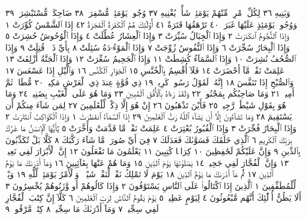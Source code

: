 وَبَنِيهِ ٣٦ لِكُلِّ ٱمْرِئࣲ مِّنْهُمْ يَوْمَئِذࣲ شَأْنࣱ يُغْنِيهِ ٣٧ وُجُوهࣱ يَوْمَئِذࣲ
مُّسْفِرَةࣱ ٣٨ ضَاحِكَةࣱ مُّسْتَبْشِرَةࣱ ٣٩ وَوُجُوهࣱ يَوْمَئِذٍ عَلَيْهَا غَبَرَةࣱ ٤٠
تَرْهَقُهَا قَتَرَةٌ ٤١ أُو۟لَٰٓئِكَ هُمُ ٱلْكَفَرَةُ ٱلْفَجَرَةُ ٤٢
إِذَا ٱلشَّمْسُ كُوِّرَتْ ١ وَإِذَا ٱلنُّجُومُ ٱنكَدَرَتْ ٢ وَإِذَا ٱلْجِبَالُ
سُيِّرَتْ ٣ وَإِذَا ٱلْعِشَارُ عُطِّلَتْ ٤ وَإِذَا ٱلْوُحُوشُ حُشِرَتْ ٥
وَإِذَا ٱلْبِحَارُ سُجِّرَتْ ٦ وَإِذَا ٱلنُّفُوسُ زُوِّجَتْ ٧ وَإِذَا ٱلْمَوْءُۥدَةُ
سُئِلَتْ ٨ بِأَيِّ ذَنۢبࣲ قُتِلَتْ ٩ وَإِذَا ٱلصُّحُفُ نُشِرَتْ ١٠
وَإِذَا ٱلسَّمَآءُ كُشِطَتْ ١١ وَإِذَا ٱلْجَحِيمُ سُعِّرَتْ ١٢ وَإِذَا ٱلْجَنَّةُ
أُزْلِفَتْ ١٣ عَلِمَتْ نَفْسࣱ مَّآ أَحْضَرَتْ ١٤ فَلَآ أُقْسِمُ بِٱلْخُنَّسِ ١٥
ٱلْجَوَارِ ٱلْكُنَّسِ ١٦ وَٱلَّيْلِ إِذَا عَسْعَسَ ١٧ وَٱلصُّبْحِ إِذَا تَنَفَّسَ ١٨
إِنَّهُۥ لَقَوْلُ رَسُولࣲ كَرِيمࣲ ١٩ ذِي قُوَّةٍ عِندَ ذِي ٱلْعَرْشِ مَكِينࣲ ٢٠ مُّطَاعࣲ ثَمَّ
أَمِينࣲ ٢١ وَمَا صَاحِبُكُم بِمَجْنُونࣲ ٢٢ وَلَقَدْ رَءَاهُ بِٱلْأُفُقِ ٱلْمُبِينِ ٢٣
وَمَا هُوَ عَلَى ٱلْغَيْبِ بِضَنِينࣲ ٢٤ وَمَا هُوَ بِقَوْلِ شَيْطَٰنࣲ رَّجِيمࣲ ٢٥
فَأَيْنَ تَذْهَبُونَ ٢٦ إِنْ هُوَ إِلَّا ذِكْرࣱ لِّلْعَٰلَمِينَ ٢٧ لِمَن شَآءَ مِنكُمْ أَن
يَسْتَقِيمَ ٢٨ وَمَا تَشَآءُونَ إِلَّآ أَن يَشَآءَ ٱللَّهُ رَبُّ ٱلْعَٰلَمِينَ ٢٩
إِذَا ٱلسَّمَآءُ ٱنفَطَرَتْ ١ وَإِذَا ٱلْكَوَاكِبُ ٱنتَثَرَتْ ٢ وَإِذَا ٱلْبِحَارُ
فُجِّرَتْ ٣ وَإِذَا ٱلْقُبُورُ بُعْثِرَتْ ٤ عَلِمَتْ نَفْسࣱ مَّا قَدَّمَتْ
وَأَخَّرَتْ ٥ يَٰٓأَيُّهَا ٱلْإِنسَٰنُ مَا غَرَّكَ بِرَبِّكَ ٱلْكَرِيمِ ٦ ٱلَّذِي
خَلَقَكَ فَسَوَّىٰكَ فَعَدَلَكَ ٧ فِيٓ أَيِّ صُورَةࣲ مَّا شَآءَ رَكَّبَكَ ٨
كَلَّا بَلْ تُكَذِّبُونَ بِٱلدِّينِ ٩ وَإِنَّ عَلَيْكُمْ لَحَٰفِظِينَ ١٠ كِرَامࣰا
كَٰتِبِينَ ١١ يَعْلَمُونَ مَا تَفْعَلُونَ ١٢ إِنَّ ٱلْأَبْرَارَ لَفِي نَعِيمࣲ ١٣ وَإِنَّ
ٱلْفُجَّارَ لَفِي جَحِيمࣲ ١٤ يَصْلَوْنَهَا يَوْمَ ٱلدِّينِ ١٥ وَمَا هُمْ عَنْهَا
بِغَآئِبِينَ ١٦ وَمَآ أَدْرَىٰكَ مَا يَوْمُ ٱلدِّينِ ١٧ ثُمَّ مَآ أَدْرَىٰكَ مَا يَوْمُ
ٱلدِّينِ ١٨ يَوْمَ لَا تَمْلِكُ نَفْسࣱ لِّنَفْسࣲ شَيْـࣰٔاۖ وَٱلْأَمْرُ يَوْمَئِذࣲ لِّلَّهِ ١٩
وَيْلࣱ لِّلْمُطَفِّفِينَ ١ ٱلَّذِينَ إِذَا ٱكْتَالُوا۟ عَلَى ٱلنَّاسِ يَسْتَوْفُونَ ٢
وَإِذَا كَالُوهُمْ أَو وَّزَنُوهُمْ يُخْسِرُونَ ٣ أَلَا يَظُنُّ أُو۟لَٰٓئِكَ أَنَّهُم مَّبْعُوثُونَ ٤
لِيَوْمٍ عَظِيمࣲ ٥ يَوْمَ يَقُومُ ٱلنَّاسُ لِرَبِّ ٱلْعَٰلَمِينَ ٦ كَلَّآ إِنَّ كِتَٰبَ
ٱلْفُجَّارِ لَفِي سِجِّينࣲ ٧ وَمَآ أَدْرَىٰكَ مَا سِجِّينࣱ ٨ كِتَٰبࣱ مَّرْقُومࣱ ٩
